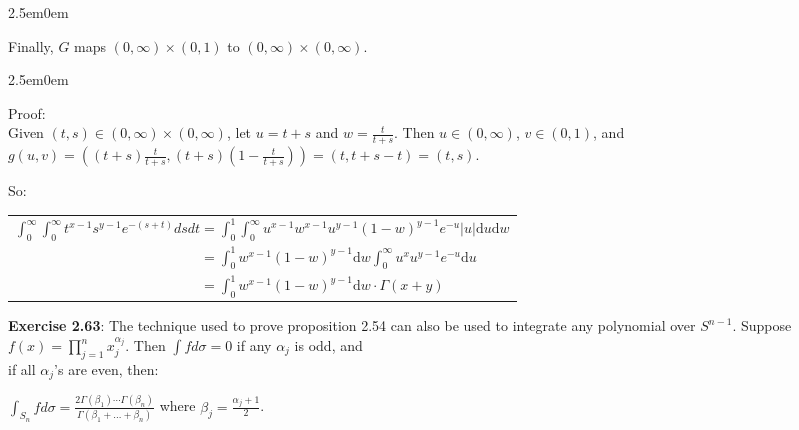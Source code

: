 \documentclass{book}
\newcommand{\exPPP}{%
   \color{VioletRed}%
   \fontsize{12}{14}\selectfont%
}
\newenvironment{myIndent}{%
   \begin{adjustwidth}{2.5em}{0em}%
}{%
   \end{adjustwidth}%
}
\newcommand{\blab}[1]{\textbf{#1}}
\newcommand{\retTwo}{\hfill\bigbreak}
\begin{document}
\begin{myIndent}
	Finally, $G$ maps $(0, \infty) \times (0, 1)$ to $(0, \infty) \times (0, \infty)$.
	\begin{myIndent}\exPPP
		Proof:\\
		Given $(t, s) \in (0, \infty) \times (0, \infty)$, let $u = t + s$ and $w = \frac{t}{t + s}$. Then $u \in (0, \infty)$, $v \in (0, 1)$, and $g(u, v) = ((t + s)\frac{t}{t + s}, (t + s)(1 - \frac{t}{t + s})) = (t, t + s - t) = (t, s)$.\retTwo
	\end{myIndent}

	So:

	{\centering
	\begin{tabular}{l}
		$\int_0^\infty \int_0^\infty t^{x-1}s^{y-1}e^{-(s + t)}dsdt = \int_0^1 \int_0^\infty u^{x-1}w^{x-1}u^{y-1}(1-w)^{y-1}e^{-u}|u|\mathrm{d}u\mathrm{d}w$\\ [6pt]

		$\phantom{\int_0^\infty \int_0^\infty t^{x-1}s^{y-1}e^{-(s + t)}dsdt} = \int_0^1 w^{x-1}(1-w)^{y-1}\mathrm{d}w\int_0^\infty u^xu^{y-1} e^{-u}\mathrm{d}u$\\ [6pt]

		$\phantom{\int_0^\infty \int_0^\infty t^{x-1}s^{y-1}e^{-(s + t)}dsdt} = \int_0^1 w^{x-1}(1-w)^{y-1}\mathrm{d}w \cdot \Gamma(x + y)$
	\end{tabular} \retTwo\par}
\end{myIndent}

\blab{Exercise 2.63}: The technique used to prove proposition 2.54 can also be used to integrate any polynomial over $S^{n-1}$. Suppose $f(x) = \prod\limits_{j=1}^n x_j^{\alpha_j}$. Then $\int f d\sigma = 0$ if any $\alpha_j$ is odd, and\\ [-2pt] if all $\alpha_j$'s are even, then:

{\centering ${\displaystyle\int_{S_n} f d\sigma = \frac{2\Gamma(\beta_1)\cdots\Gamma(\beta_n)}{\Gamma(\beta_1 + \ldots + \beta_n)}}$ where ${\displaystyle \beta_j = \frac{\alpha_j + 1}{2}}$.\retTwo\par}
\end{document}
